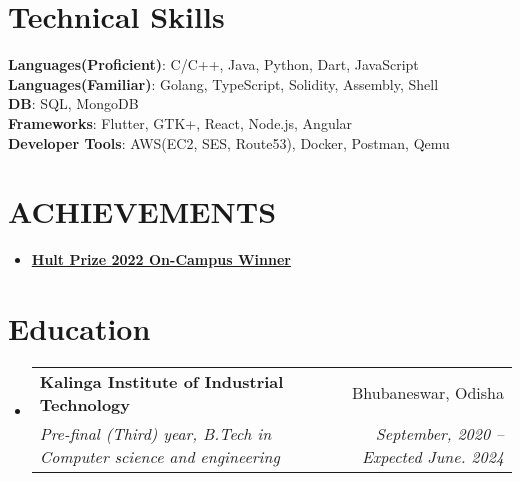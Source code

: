 \documentclass[letterpaper,11pt]{article}
\makeatletter
\newcommand{\resumeItem}[1]{
  \item\small{
    {#1 \vspace{-2pt}}
  }
}
\newcommand{\resumeSubheading}[4]{
  \vspace{-2pt}\item
    \begin{tabular*}{0.97\textwidth}[t]{l@{\extracolsep{\fill}}r}
      \textbf{#1} & #2 \\
      \textit{\small#3} & \textit{\small #4} \\
    \end{tabular*}\vspace{-7pt}
}
\newcommand{\resumeSubHeadingListStart}{\begin{itemize}[leftmargin=0.15in, label={}]}
\newcommand{\resumeSubHeadingListEnd}{\end{itemize}}
\newcommand{\resumeItemListStart}{\begin{itemize}}
\newcommand{\resumeItemListEnd}{\end{itemize}\vspace{-5pt}}
\makeatother
\begin{document}
%
\section{Technical Skills}
 \begin{itemize}[leftmargin=0.15in, label={}]
    \small{\item{
     \textbf{Languages(Proficient)}{: C/C++, Java, Python, Dart, JavaScript } \\
      \textbf{Languages(Familiar)}{: Golang, TypeScript, Solidity, Assembly, Shell } \\
      \textbf{DB}{: SQL, MongoDB} \\
     \textbf{Frameworks}{: Flutter, GTK+, React, Node.js, Angular } \\
     \textbf{Developer Tools}{: AWS(EC2, SES, Route53), Docker, Postman, Qemu } \\
    }}
 \end{itemize}


\section{ACHIEVEMENTS}
 \begin{itemize}[leftmargin=0.15in, label={}]
    \small{\item{
        \resumeItemListStart
            \resumeItem{\textbf{\href{https://www.linkedin.com/posts/dshekhar17_hultprize2022-hultprizekiit-kiituniversity-activity-6899007358467743746-6hZ3}{Hult Prize 2022 On-Campus Winner}}}
            
      \resumeItemListEnd
    }}
 \end{itemize}
 
\section{Education}
  \resumeSubHeadingListStart
    \resumeSubheading
      {Kalinga Institute of Industrial Technology}{Bhubaneswar, Odisha}
      {Pre-final (Third) year, B.Tech in Computer science and engineering}{September, 2020 -- Expected June. 2024}
  \resumeSubHeadingListEnd
\end{document}
